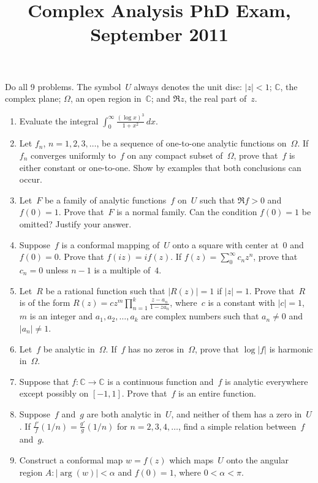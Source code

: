 \documentclass[11pt,letterpaper]{article}
\title{Complex Analysis PhD Exam, September 2011}
\author{}
\date{}
\newenvironment{examproblems}[2]{%
  \def\ProblemHeadingTag{#2}%
  \AssignTaggingSocketPlug{block/list/label}{examproblem}%
  \begin{enumerate}%
  \setcounter{enumi}{#1}%
  \renewcommand{\labelenumi}{\textbf{\theenumi.}}%
  \setlength{\topsep}{0.35em}%
  \setlength{\partopsep}{0pt}%
  \setlength{\itemsep}{0.48em}%
  \setlength{\parsep}{0.18em}%
}{\end{enumerate}}
\newenvironment{examinstructions}{%
  \par\begingroup\itshape
}{%
  \par\endgroup\vspace{0.18em}
}
\begin{document}
\maketitle
\thispagestyle{empty}
\begin{examinstructions}
Do all 9 problems. The symbol~\(U\) always denotes the unit disc: \(|z|<1\); \(\mathbb{C}\), the complex plane; \(\Omega\), an open region in~\(\mathbb{C}\); and \(\Re z\), the real part of~\(z\).
\end{examinstructions}
\begin{examproblems}{0}{H2}
\def\ProblemHeadingText{Problem 1.}
\item
Evaluate the integral \(\displaystyle \int_0^\infty \frac{(\log x)^3}{1+x^2}\,dx\).
\def\ProblemHeadingText{Problem 2.}
\item
Let \(f_n\), \(n=1,2,3,\ldots\), be a sequence of one-to-one analytic functions on~\(\Omega\). If \(f_n\) converges uniformly to~\(f\) on any compact subset of~\(\Omega\), prove that~\(f\) is either constant or one-to-one. Show by examples that both conclusions can occur.
\def\ProblemHeadingText{Problem 3.}
\item
Let~\(F\) be a family of analytic functions~\(f\) on~\(U\) such that \(\Re f>0\) and \(f(0)=1\). Prove that~\(F\) is a normal family. Can the condition \(f(0)=1\) be omitted? Justify your answer.
\def\ProblemHeadingText{Problem 4.}
\item
Suppose~\(f\) is a conformal mapping of~\(U\) onto a square with center at~\(0\) and \(f(0)=0\). Prove that \(f(iz)=if(z)\). If \(f(z)=\sum_0^\infty c_nz^n\), prove that \(c_n=0\) unless \(n-1\) is a multiple of~\(4\).
\def\ProblemHeadingText{Problem 5.}
\item
Let~\(R\) be a rational function such that \(|R(z)|=1\) if \(|z|=1\). Prove that~\(R\) is of the form \(R(z)=cz^m\prod_{n=1}^k\frac{z-a_n}{1-z\overline{a_n}}\), where~\(c\) is a constant with \(|c|=1\), \(m\) is an integer and \(a_1,a_2,\ldots,a_k\) are complex numbers such that \(a_n\ne 0\) and \(|a_n|\ne 1\).
\def\ProblemHeadingText{Problem 6.}
\item
Let~\(f\) be analytic in~\(\Omega\). If~\(f\) has no zeros in~\(\Omega\), prove that \(\log|f|\) is harmonic in~\(\Omega\).
\def\ProblemHeadingText{Problem 7.}
\item
Suppose that \(f:\mathbb{C}\to\mathbb{C}\) is a continuous function and~\(f\) is analytic everywhere except possibly on \([-1,1]\). Prove that~\(f\) is an entire function.
\def\ProblemHeadingText{Problem 8.}
\item
Suppose~\(f\) and~\(g\) are both analytic in~\(U\), and neither of them has a zero in~\(U\). If \(\frac{f'}{f}(1/n)=\frac{g'}{g}(1/n)\) for \(n=2,3,4,\ldots\), find a simple relation between~\(f\) and~\(g\).
\def\ProblemHeadingText{Problem 9.}
\item
Construct a conformal map \(w=f(z)\) which maps~\(U\) onto the angular region \(A:|\arg(w)|<\alpha\) and \(f(0)=1\), where \(0<\alpha<\pi\).
\end{examproblems}
\end{document}
